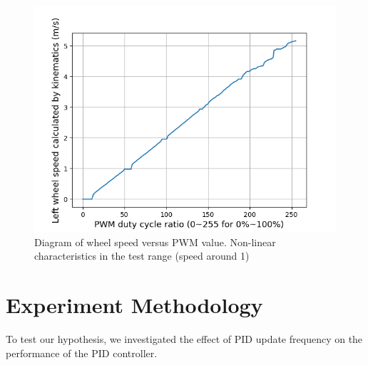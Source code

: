 \documentclass[conference]{IEEEtran}
\begin{document}
\begin{figure}[htbp]
\centerline{\includegraphics[width = \linewidth]{Report/Pic/WheelResponse.png}}
\caption{Diagram of wheel speed versus PWM value. Non-linear characteristics in the test range (speed around 1)} %
\label{fig_WheelCharacter}
\end{figure}



\section{Experiment Methodology}

To test our hypothesis, we investigated the effect of PID update frequency on the performance of the PID controller.

% 
\end{document}
